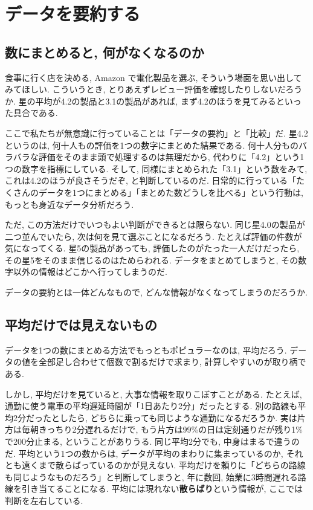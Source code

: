 \section{データを要約する}

  \subsection{数にまとめると, 何がなくなるのか}

    食事に行く店を決める, Amazon で電化製品を選ぶ, そういう場面を思い出してみてほしい.
    こういうとき, とりあえずレビュー評価を確認したりしないだろうか.
    星の平均が4.2の製品と3.1の製品があれば, まず4.2のほうを見てみるといった具合である.

    ここで私たちが無意識に行っていることは「データの要約」と「比較」だ.
    星4.2というのは, 何十人もの評価を1つの数字にまとめた結果である.
    何十人分ものバラバラな評価をそのまま頭で処理するのは無理だから, 代わりに「4.2」という1つの数字を指標にしている.
    そして, 同様にまとめられた「3.1」という数をみて, これは4.2のほうが良さそうだぞ, と判断しているのだ.
    日常的に行っている「たくさんのデータを1つにまとめる」「まとめた数どうしを比べる」という行動は, もっとも身近なデータ分析だろう.

    ただ, この方法だけでいつもよい判断ができるとは限らない.
    同じ星4.0の製品が二つ並んでいたら, 次は何を見て選ぶことになるだろう.
    たとえば評価の件数が気になってくる.
    星5の製品があっても, 評価したのがたった一人だけだったら, その星5をそのまま信じるのはためらわれる.
    データをまとめてしまうと, その数字以外の情報はどこかへ行ってしまうのだ.

    データの要約とは一体どんなもので, どんな情報がなくなってしまうのだろうか.


  \subsection{平均だけでは見えないもの}

    データを1つの数にまとめる方法でもっともポピュラーなのは, 平均だろう.
    データの値を全部足し合わせて個数で割るだけで求まり, 計算しやすいのが取り柄である.

    しかし, 平均だけを見ていると, 大事な情報を取りこぼすことがある.
    たとえば, 通勤に使う電車の平均遅延時間が「1日あたり2分」だったとする.
    別の路線も平均2分だったとしたら, どちらに乗っても同じような通勤になるだろうか.
    実は片方は毎朝きっちり2分遅れるだけで, もう片方は99\%の日は定刻通りだが残り1\%で200分止まる, ということがありうる.
    同じ平均2分でも, 中身はまるで違うのだ.
    平均という1つの数からは, データが平均のまわりに集まっているのか, それとも遠くまで散らばっているのかが見えない.
    平均だけを頼りに「どちらの路線も同じようなものだろう」と判断してしまうと, 年に数回, 始業に3時間遅れる路線を引き当てることになる.
    平均には現れない\textbf{散らばり}という情報が, ここでは判断を左右している.

